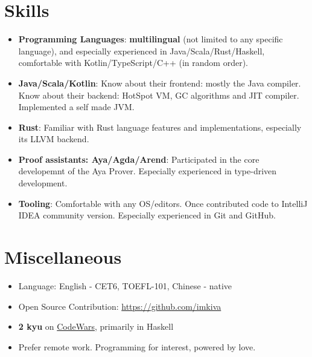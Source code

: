 \documentclass{resume}
\begin{document}
\section{Skills}
\begin{itemize}[parsep=0.25ex]
  \item \textbf{Programming Languages}:
    \textbf{multilingual} (not limited to any specific language),
    and especially experienced in Java/Scala/Rust/Haskell,
    comfortable with Kotlin/TypeScript/C++ (in random order).

  \item \textbf{Java/Scala/Kotlin}:
    Know about their frontend: mostly the Java compiler. 
    Know about their backend: HotSpot VM, GC algorithms and JIT compiler.
    Implemented a self made JVM.
  
  \item \textbf{Rust}:
    Familiar with Rust language features and implementations,
    especially its LLVM backend.

  \item \textbf{Proof assistants: Aya/Agda/Arend}:
    Participated in the core developemnt of the Aya Prover.
    Especially experienced in type-driven development.
  
  \item \textbf{Tooling}:
    Comfortable with any OS/editors. Once contributed code to IntelliJ IDEA community version.
    Especially experienced in Git and GitHub.
\end{itemize}

\section{Miscellaneous}
\begin{itemize}[parsep=0.25ex]
  \item Language: English - CET6, TOEFL-101, Chinese - native
  \item Open Source Contribution: \url{https://github.com/imkiva}
  \item \textbf{2 kyu} on \href{https://www.codewars.com/users/imkiva} {CodeWars}, primarily in Haskell
  \item Prefer remote work. Programming for interest, powered by love.
\end{itemize}
\end{document}
